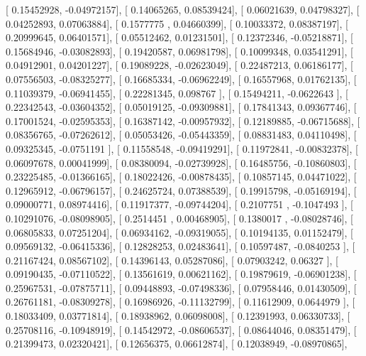 \documentclass{article}
\begin{document}
       [ 0.15452928, -0.04972157],
       [ 0.14065265,  0.08539424],
       [ 0.06021639,  0.04798327],
       [ 0.04252893,  0.07063884],
       [ 0.1577775 ,  0.04660399],
       [ 0.10033372,  0.08387197],
       [ 0.20999645,  0.06401571],
       [ 0.05512462,  0.01231501],
       [ 0.12372346, -0.05218871],
       [ 0.15684946, -0.03082893],
       [ 0.19420587,  0.06981798],
       [ 0.10099348,  0.03541291],
       [ 0.04912901,  0.04201227],
       [ 0.19089228, -0.02623049],
       [ 0.22487213,  0.06186177],
       [ 0.07556503, -0.08325277],
       [ 0.16685334, -0.06962249],
       [ 0.16557968,  0.01762135],
       [ 0.11039379, -0.06941455],
       [ 0.22281345,  0.098767  ],
       [ 0.15494211, -0.0622643 ],
       [ 0.22342543, -0.03604352],
       [ 0.05019125, -0.09309881],
       [ 0.17841343,  0.09367746],
       [ 0.17001524, -0.02595353],
       [ 0.16387142, -0.00957932],
       [ 0.12189885, -0.06715688],
       [ 0.08356765, -0.07262612],
       [ 0.05053426, -0.05443359],
       [ 0.08831483,  0.04110498],
       [ 0.09325345, -0.0751191 ],
       [ 0.11558548, -0.09419291],
       [ 0.11972841, -0.00832378],
       [ 0.06097678,  0.00041999],
       [ 0.08380094, -0.02739928],
       [ 0.16485756, -0.10860803],
       [ 0.23225485, -0.01366165],
       [ 0.18022426, -0.00878435],
       [ 0.10857145,  0.04471022],
       [ 0.12965912, -0.06796157],
       [ 0.24625724,  0.07388539],
       [ 0.19915798, -0.05169194],
       [ 0.09000771,  0.08974416],
       [ 0.11917377, -0.09744204],
       [ 0.2107751 , -0.1047493 ],
       [ 0.10291076, -0.08098905],
       [ 0.2514451 ,  0.00468905],
       [ 0.1380017 , -0.08028746],
       [ 0.06805833,  0.07251204],
       [ 0.06934162, -0.09319055],
       [ 0.10194135,  0.01152479],
       [ 0.09569132, -0.06415336],
       [ 0.12828253,  0.02483641],
       [ 0.10597487, -0.0840253 ],
       [ 0.21167424,  0.08567102],
       [ 0.14396143,  0.05287086],
       [ 0.07903242,  0.06327   ],
       [ 0.09190435, -0.07110522],
       [ 0.13561619,  0.00621162],
       [ 0.19879619, -0.06901238],
       [ 0.25967531, -0.07875711],
       [ 0.09448893, -0.07498336],
       [ 0.07958446,  0.01430509],
       [ 0.26761181, -0.08309278],
       [ 0.16986926, -0.11132799],
       [ 0.11612909,  0.0644979 ],
       [ 0.18033409,  0.03771814],
       [ 0.18938962,  0.06098008],
       [ 0.12391993,  0.06330733],
       [ 0.25708116, -0.10948919],
       [ 0.14542972, -0.08606537],
       [ 0.08644046,  0.08351479],
       [ 0.21399473,  0.02320421],
       [ 0.12656375,  0.06612874],
       [ 0.12038949, -0.08970865],
\end{document}
